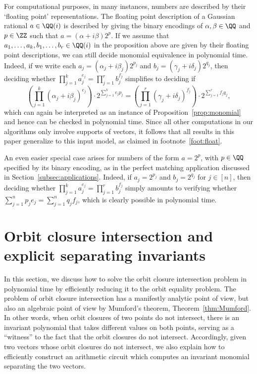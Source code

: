 \begin{remark}\label{rem:float}
For computational purposes, in many instances, numbers are described by their `floating point' representations.
The floating point description of a Gaussian rational $a \in \QQ(i)$ is described by giving the binary encodings of $\alpha,\beta \in \QQ$ and $p \in \ZZ$ such that $a = (\alpha+ i \beta) 2^p$.
If we assume that $a_1,\dots,a_k,b_1,\dots,b_r\in \QQ(i)$ in the proposition above are given by their floating point descriptions, we can still decide monomial equivalence in polynomial time.
Indeed, if we write each $a_j = (\alpha_j + i \beta_j) 2^{p_j}$ and $b_j = (\gamma_j + i \delta_j) 2^{q_j}$, then deciding whether $\prod_{j=1}^k a_j^{e_j} = \prod_{j=1}^r b_j^{f_j}$ simplifies to deciding if
\[
\left(\prod_{j=1}^k (\alpha_j + i \beta_j)^{e_j} \right) \cdot 2^{\sum_{j=1}^k e_j p_j} = \left(\prod_{j=1}^r (\gamma_j + i \delta_j)^{f_j}\right) \cdot 2^{\sum_{j=1}^r f_j q_j},
\]
which can again be interpreted as an instance of Proposition~\ref{prop:monomial} and hence can be checked in polynomial time.
Since all other computations in our algorithms only involve supports of vectors, it follows that all results in this paper generalize to this input model, as claimed in footnote~\ref{foot:float}.

An even easier special case arises for numbers of the form $a=2^p$, with $p\in\QQ$ specified by its binary encoding, as in the perfect matching application discussed in Section~\ref{subsec:applications}.
Indeed, if $a_j = 2^{p_j}$ and $b_j = 2^{q_j}$ for $j\in[n]$, then deciding whether $\prod_{j=1}^k a_j^{e_j} = \prod_{j=1}^r b_j^{f_j}$ simply amounts to verifying whether $\sum_{j=1}^n p_j e_j = \sum_{j=1}^n q_j f_j$, which is clearly possible in polynomial time.
\end{remark}


%
\section{Orbit closure intersection and explicit separating invariants}\label{sec:oci-to-oe}
%
In this section, we discuss how to solve the orbit closure intersection problem in polynomial time by efficiently reducing it to the orbit equality problem.
The problem of orbit closure intersection has a manifestly analytic point of view, but also an algebraic point of view by Mumford's theorem, Theorem~\ref{thm:Mumford}.
In other words, when orbit closures of two points do not intersect, there is an invariant polynomial that takes different values on both points, serving as a ``witness'' to the fact that the orbit closures do not intersect.
Accordingly, given two vectors whose orbit closures do not intersect, we also explain how to efficiently construct an arithmetic circuit which computes an invariant monomial separating the two vectors.

